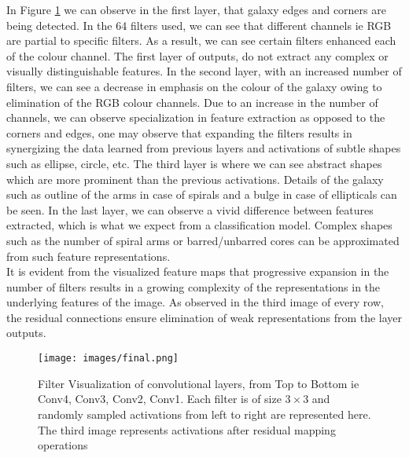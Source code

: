 \documentclass[fleqn,usenatbib]{mnras}
\begin{document}
\hspace*{0.25 in} In Figure \ref{fig:Filter Visualization} we can observe in the first layer, that galaxy edges and corners are being detected. In the 64 filters used, we can see that different channels ie RGB are partial to specific filters. As a result, we can see certain filters enhanced each of the colour channel. The first layer of outputs, do not extract any complex or visually distinguishable features. In the second layer, with an increased number of filters, we can see a decrease in emphasis on the colour of the galaxy owing to elimination of the RGB colour channels. Due to an increase in the number of channels, we can observe specialization in feature extraction as opposed to the corners and edges, one may observe that expanding the filters results in synergizing  the data learned from previous layers and activations of subtle shapes such as ellipse, circle, etc. The third layer is where we can see abstract shapes which are more prominent than the previous activations. Details of the galaxy such as outline of the arms in case of spirals and a bulge in case of ellipticals can be seen. In the last layer, we can observe a vivid difference between features extracted, which is what we expect from a classification model. Complex shapes such as the number of spiral arms or barred/unbarred cores can be approximated from such feature representations. \\
\hspace*{0.25 in}It is evident from the visualized feature maps that progressive expansion in the number of filters results in a growing complexity of the representations in the underlying features of the image. As observed in the third image of every row, the residual connections ensure elimination of weak representations from the layer outputs. 

\begin{figure}
    \centering
    \texttt{[image: images/final.png]}
    \caption{Filter Visualization of convolutional layers, from Top to Bottom ie Conv4, Conv3, Conv2, Conv1. Each filter is of size $3\times3$ and randomly sampled activations from left to right are represented here. The third image represents activations after residual mapping operations}
    \label{fig:Filter Visualization}
\end{figure} 
\end{document}

